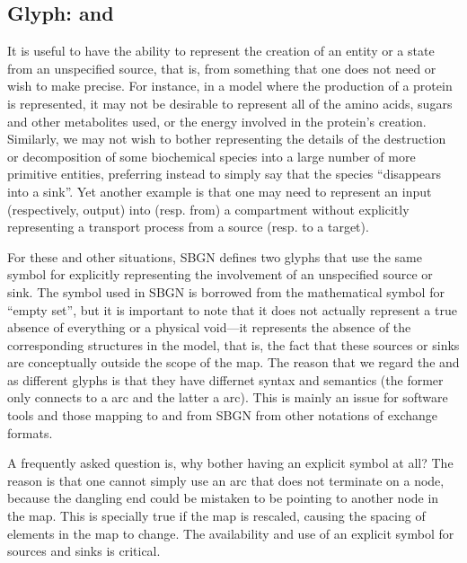 
\subsection{Glyph:  and }
\label{sec:sourceSink}

It is useful to have the ability to represent the creation of an entity or
a state from an unspecified source, that is, from something that one does
not need or wish to make precise.  For instance, in a model where the
production of a protein is represented, it may not be desirable to
represent all of the amino acids, sugars and other metabolites used, or the
energy involved in the protein's creation.  Similarly, we may not wish to
bother representing the details of the destruction or decomposition of some
biochemical species into a large number of more primitive entities,
preferring instead to simply say that the species ``disappears into a
sink''.  Yet another example is that one may need to represent an input
(respectively, output) into (resp. from) a compartment without explicitly
representing a transport process from a source (resp. to a target).

For these and other situations, SBGN defines two glyphs that use the same symbol for explicitly
representing the involvement of an unspecified source or sink.  The symbol
used in SBGN is borrowed from the mathematical symbol for ``empty set'',
but it is important to note that it does not actually represent a true
absence of everything or a physical void---it represents the absence of the
corresponding structures in the model, that is, the fact that these sources
or sinks are conceptually outside the scope of the map. The reason that we
regard the  and  as different glyphs is that they have differnet
syntax and semantics (the former only connects to a  arc and the latter
a  arc). This is mainly an issue for software tools and those mapping to
and from SBGN from other notations of exchange formats.

A frequently asked question is, why bother having an explicit symbol at
all?  The reason is that one cannot simply use an arc that does not
terminate on a node, because the dangling end could be mistaken to be
pointing to another node in the map.  This is specially true if the
map is rescaled, causing the spacing of elements in the map to
change.  The availability and use of an explicit symbol for sources and
sinks is critical.

